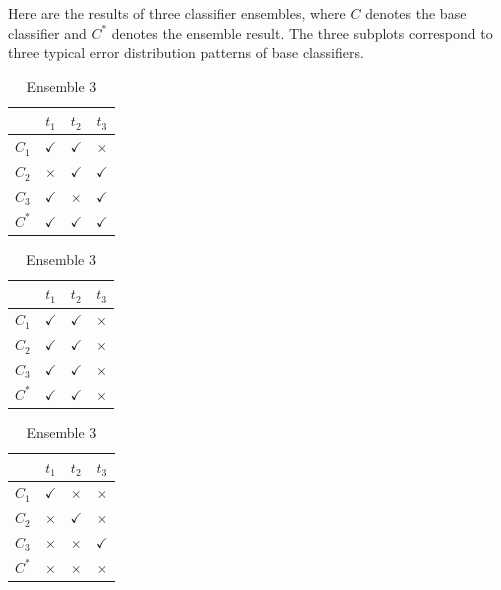 \documentclass[12pt,letterpaper, onecolumn]{exam}
\begin{document}
\begin{questions}
    \newpage
    \question Here are the results of three classifier ensembles, where $C$ denotes the base classifier and $C^*$ denotes the ensemble result. The three subplots correspond to three typical error distribution patterns of base classifiers.
        \begin{table}[!h]
        \centering
        \begin{minipage}{0.32\textwidth}
        \centering
        \caption{Ensemble 1}
        \begin{tabular}{c|ccc}
        \hline
         & $t_1$ & $t_2$ & $t_3$ \\
        \hline
        $C_1$ & $\checkmark$ & $\checkmark$ & $\times$ \\
        $C_2$ & $\times$ & $\checkmark$ & $\checkmark$ \\
        $C_3$ & $\checkmark$ & $\times$ & $\checkmark$ \\
        $C^*$ & $\checkmark$ & $\checkmark$ & $\checkmark$ \\
        \hline
        \end{tabular}
        \end{minipage}
        \hfill
        \begin{minipage}{0.32\textwidth}
        \centering
        \caption{Ensemble 2}
        \begin{tabular}{c|ccc}
        \hline
         & $t_1$ & $t_2$ & $t_3$ \\
        \hline
        $C_1$ & $\checkmark$ & $\checkmark$ & $\times$ \\
        $C_2$ & $\checkmark$ & $\checkmark$ & $\times$ \\
        $C_3$ & $\checkmark$ & $\checkmark$ & $\times$ \\
        $C^*$ & $\checkmark$ & $\checkmark$ & $\times$ \\
        \hline
        \end{tabular}
        \end{minipage}
        \hfill
        \begin{minipage}{0.32\textwidth}
        \centering
        \caption{Ensemble 3}
        \begin{tabular}{c|ccc}
        \hline
         & $t_1$ & $t_2$ & $t_3$ \\
        \hline
        $C_1$ & $\checkmark$ & $\times$ & $\times$ \\
        $C_2$ & $\times$ & $\checkmark$ & $\times$ \\
        $C_3$ & $\times$ & $\times$ & $\checkmark$ \\
        $C^*$ & $\times$ & $\times$ & $\times$ \\
        \hline
        \end{tabular}
        \end{minipage}
        \end{table}


\end{questions}
\end{document}
